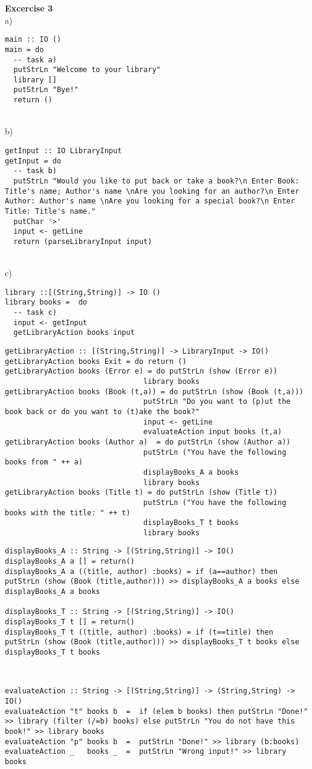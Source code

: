 \documentclass[a4paper,12pt,oneside]{book}
\begin{document}
\textbf{Excercise 3} \\%
a)
\begin{lstlisting}
main :: IO ()
main = do
  -- task a)
  putStrLn "Welcome to your library"
  library []
  putStrLn "Bye!"
  return ()
\end{lstlisting}
~\\
b)
\begin{lstlisting}
getInput :: IO LibraryInput
getInput = do
  -- task b)
  putStrLn "Would you like to put back or take a book?\n Enter Book: Title's name; Author's name \nAre you looking for an author?\n Enter Author: Author's name \nAre you looking for a special book?\n Enter Title: Title's name."
  putChar '>'
  input <- getLine
  return (parseLibraryInput input)
\end{lstlisting}
~\\
c)
\begin{lstlisting}
library ::[(String,String)] -> IO ()
library books =  do
  -- task c)
  input <- getInput
  getLibraryAction books input
  \end{lstlisting}

 \begin{lstlisting}
getLibraryAction :: [(String,String)] -> LibraryInput -> IO()
getLibraryAction books Exit = do return ()
getLibraryAction books (Error e) = do putStrLn (show (Error e))
								library books
getLibraryAction books (Book (t,a)) = do putStrLn (show (Book (t,a)))
								putStrLn "Do you want to (p)ut the book back or do you want to (t)ake the book?"
								input <- getLine
								evaluateAction input books (t,a)
getLibraryAction books (Author a)  = do putStrLn (show (Author a))
								putStrLn ("You have the following books from " ++ a)
								displayBooks_A a books
								library books
getLibraryAction books (Title t) = do putStrLn (show (Title t))
								putStrLn ("You have the following books with the title: " ++ t)
								displayBooks_T t books
								library books
\end{lstlisting}
\begin{lstlisting}
displayBooks_A :: String -> [(String,String)] -> IO()
displayBooks_A a [] = return()
displayBooks_A a ((title, author) :books) = if (a==author) then putStrLn (show (Book (title,author))) >> displayBooks_A a books else displayBooks_A a books

displayBooks_T :: String -> [(String,String)] -> IO()
displayBooks_T t [] = return()
displayBooks_T t ((title, author) :books) = if (t==title) then putStrLn (show (Book (title,author))) >> displayBooks_T t books else displayBooks_T t books
\end{lstlisting}
~\\
\begin{lstlisting}
evaluateAction :: String -> [(String,String)] -> (String,String) -> IO()
evaluateAction "t" books b  =  if (elem b books) then putStrLn "Done!" >> library (filter (/=b) books) else putStrLn "You do not have this book!" >> library books
evaluateAction "p" books b  =  putStrLn "Done!" >> library (b:books)
evaluateAction _   books _  =  putStrLn "Wrong input!" >> library books
\end{lstlisting}
\end{document}
